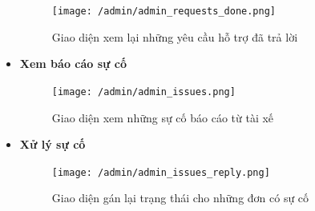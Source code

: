\begin{itemize}
	\begin{figure}[H]
		\texttt{[image: /admin/admin\_requests\_done.png]}
		\centering
		\caption{Giao diện xem lại những yêu cầu hỗ trợ đã trả lời}
	\end{figure}

	\item \textbf{Xem báo cáo sự cố}
	\begin{figure}[H]
		\texttt{[image: /admin/admin\_issues.png]}
		\centering
		\caption{Giao diện xem những sự cố báo cáo từ tài xế}
	\end{figure}


	\item \textbf{Xử lý sự cố}
	\begin{figure}[H]
		\texttt{[image: /admin/admin\_issues\_reply.png]}
		\centering
		\caption{Giao diện gán lại trạng thái cho những đơn có sự cố}
	\end{figure}
		
\end{itemize}

